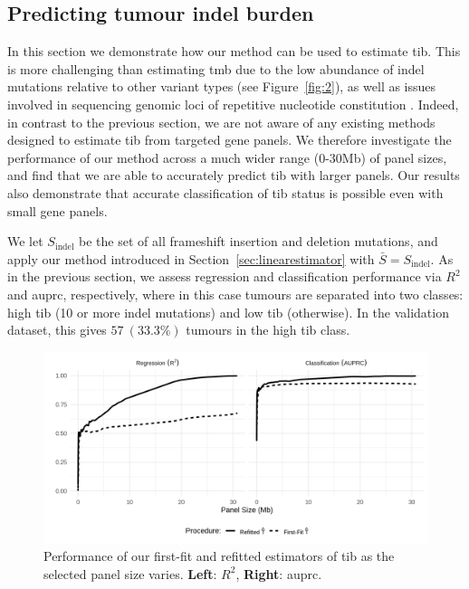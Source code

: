 \documentclass[../thesis.tex]{subfiles}
\begin{document}
\subsection{Predicting tumour indel burden \label{sec:indel}}

In this section we demonstrate how our method can be used to estimate \gls{tib}. 
This is more challenging than estimating \gls{tmb} due to the low abundance of indel mutations relative to other variant types (see Figure~\ref{fig:2}), as well as issues involved in sequencing genomic loci of repetitive nucleotide constitution \citep{narzisi_challenge_2015}. Indeed, in contrast to the previous section, we are not aware of any existing methods designed to estimate \gls{tib} from targeted gene panels.  We therefore investigate the performance of our method across a much wider range (0-30Mb) of panel sizes, and find that we are able to accurately predict \gls{tib} with larger panels.
Our results also demonstrate that accurate classification of \gls{tib} status is possible even with small gene panels. 

We let $S_{\text{indel}}$ be the set of all frameshift insertion and deletion mutations, and apply our method introduced in Section~\ref{sec:linearestimator} with $\bar{S} = S_{\text{indel}}$. As in the previous section, we assess regression and classification performance via $R^2$ and \gls{auprc}, respectively, where in this case tumours are separated into two classes: high \gls{tib} (10 or more indel mutations) and low \gls{tib} (otherwise). In the validation dataset, this gives $57 \ (33.3 \% )$ tumours in the high \gls{tib} class. 

\begin{figure}[htbp]
\centering
\includegraphics[width=6in]{../figures/chapter3/fig9.png}
\vspace*{-5mm}
\caption{Performance of our first-fit and refitted estimators of \gls{tib} as the selected panel size varies. \textbf{Left}: $R^2$, \textbf{Right}: \gls{auprc}. \label{fig:indelstatsplot}}
\vspace*{-2mm}
\end{figure}
\end{document}
